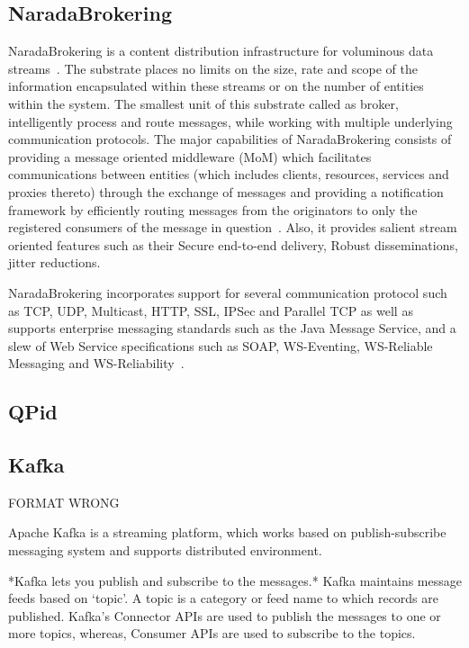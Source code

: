         \pv

\subsection{NaradaBrokering}

NaradaBrokering is a content distribution infrastructure for
voluminous data streams~\cite{www-narada}.  The substrate places no
limits on the size, rate and scope of the information encapsulated
within these streams or on the number of entities within the
system. The smallest unit of this substrate called as broker,
intelligently process and route messages, while working with multiple
underlying communication protocols. The major capabilities of
NaradaBrokering consists of providing a message oriented middleware
(MoM) which facilitates communications between entities (which
includes clients, resources, services and proxies thereto) through the
exchange of messages and providing a notification framework by
efficiently routing messages from the originators to only the
registered consumers of the message in
question~\cite{paper-nb-sustrate}. Also, it provides salient stream
oriented features such as their Secure end-to-end delivery, Robust
disseminations, jitter reductions.

NaradaBrokering incorporates support for several communication
protocol such as TCP, UDP, Multicast, HTTP, SSL, IPSec and Parallel
TCP as well as supports enterprise messaging standards such as the
Java Message Service, and a slew of Web Service specifications such as
SOAP, WS-Eventing, WS-Reliable Messaging and
WS-Reliability~\cite{www-narada-features}.

     \pv

     
\subsection{QPid}

\pv

\subsection{Kafka}

     FORMAT WRONG 

     Apache Kafka is a streaming platform, which works based on
     publish-subscribe messaging system and supports distributed
     environment.
      
     *Kafka lets you publish and subscribe to the messages.* Kafka
     maintains message feeds based on ‘topic’. A topic is a category
     or feed name to which records are published. Kafka’s Connector
     APIs are used to publish the messages to one or more topics,
     whereas, Consumer APIs are used to subscribe to the topics.

